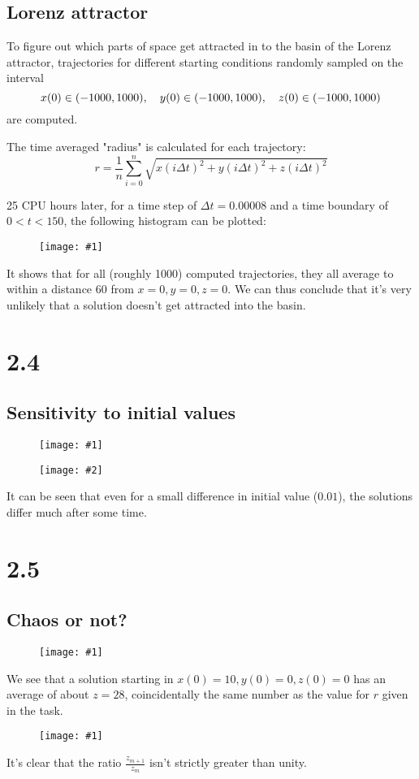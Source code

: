 \documentclass[11pt]{article}
\newcommand{\doublefigure}[2]{
\begin{figure}[H]
  \centering
  \begin{minipage}{0.45\textwidth}
    \centering
    \texttt{[image: \#1]}
  \end{minipage}
  \begin{minipage}{0.45\textwidth}
    \centering
    \texttt{[image: \#2]}
  \end{minipage}
\end{figure}
}
\newcommand{\singlefigure}[1]{
\begin{figure}[H]
  \centering
  \begin{minipage}{0.4\textwidth}
    \centering
    \texttt{[image: \#1]}
  \end{minipage}
\end{figure}
}
\begin{document}
\subsection*{Lorenz attractor}
To figure out which parts of space get attracted in to the basin of the Lorenz attractor, trajectories for different starting conditions randomly sampled on the interval
$$
x(0) \in (-1000, 1000), \quad
y(0) \in (-1000, 1000), \quad
z(0) \in (-1000, 1000) \\
$$
are computed. 

The time averaged "radius" is calculated for each trajectory:
$$
r = \frac{1}{n} \sum_{i=0}^n{\sqrt{x{(i \Delta t)}^2 + y{(i \Delta t)}^2 + z{(i \Delta t)}^2}}
$$

25 CPU hours later, for a time step of $\Delta t = 0.00008$ and a time boundary of $0 < t < 150$, the following histogram can be plotted:
\singlefigure{./plots/2_3/histo.png}

It shows that for all (roughly 1000) computed trajectories, they all average to within a distance 60 from $x = 0, y = 0, z = 0$.
We can thus conclude that it's very unlikely that a solution doesn't get attracted into the basin.

\section*{2.4}

\subsection*{Sensitivity to initial values}
\doublefigure{./plots/2_4/solution.png}{./plots/2_4/difference.png}

It can be seen that even for a small difference in initial value ($0.01$), the solutions differ much after some time.


\section*{2.5}

\begin{multicols}{2}
\subsection*{Chaos or not?}
\singlefigure{./plots/2_5/study.png}
We see that a solution starting in $x(0) = 10, y(0) = 0, z(0) = 0$ has an average of about $z = 28$, coincidentally the same number as the value for $r$ given in the task.
 
\columnbreak
\singlefigure{./plots/2_5/peaks.png}
It's clear that the ratio $\frac{z_{m+1}}{z_m}$ isn't strictly greater than unity.
\end{multicols}
\end{document}
